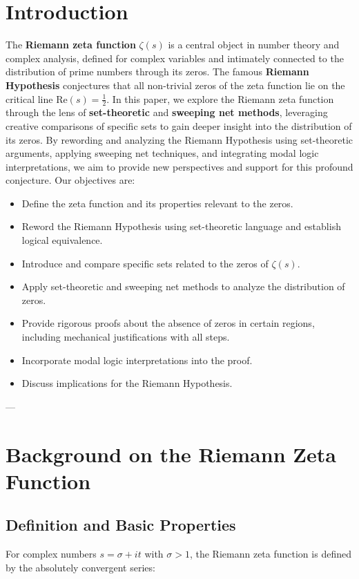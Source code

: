 \documentclass{article}
\author{Parker Emmerson}
\date{October 2024}
\begin{document}
 \maketitle \tableofcontents \section{Introduction} The \textbf{Riemann zeta function} $\zeta(s)$ is a central object in number theory and complex analysis, defined for complex variables and intimately connected to the distribution of prime numbers through its zeros. The famous \textbf{Riemann Hypothesis} conjectures that all non-trivial zeros of the zeta function lie on the critical line $\mathrm{Re}(s) = \tfrac{1}{2}$. In this paper, we explore the Riemann zeta function through the lens of \textbf{set-theoretic} and \textbf{sweeping net methods}, leveraging creative comparisons of specific sets to gain deeper insight into the distribution of its zeros. By rewording and analyzing the Riemann Hypothesis using set-theoretic arguments, applying sweeping net techniques, and integrating modal logic interpretations, we aim to provide new perspectives and support for this profound conjecture. Our objectives are: \begin{itemize} \item Define the zeta function and its properties relevant to the zeros. \item Reword the Riemann Hypothesis using set-theoretic language and establish logical equivalence. \item Introduce and compare specific sets related to the zeros of $\zeta(s)$. \item Apply set-theoretic and sweeping net methods to analyze the distribution of zeros. \item Provide rigorous proofs about the absence of zeros in certain regions, including mechanical justifications with all steps. \item Incorporate modal logic interpretations into the proof. \item Discuss implications for the Riemann Hypothesis.
\end{itemize} --- \section{Background on the Riemann Zeta Function} \subsection{Definition and Basic Properties} For complex numbers $s = \sigma + it$ with $\sigma > 1$, the Riemann zeta function is defined by the absolutely convergent series: \begin{equation}

\end{equation}
\end{document}
